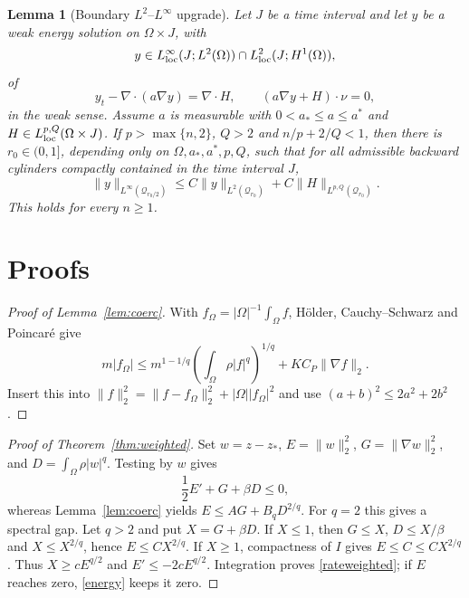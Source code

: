 \documentclass[final,5p,times,twocolumn]{elsarticle}
\newtheorem{lemma}[theorem]{Lemma}
\newcommand{\Om}{\Omega}
\newcommand{\norm}[1]{\lVert#1\rVert}
\begin{document}
\begin{lemma}[Boundary $L^2$--$L^\infty$ upgrade]\label{lem:local}
Let $J$ be a time interval and let $y$ be a weak energy solution on $\Om\times J$, with
\[
 y\in L^\infty_{\rm loc}(J;L^2(\Om))\cap L^2_{\rm loc}(J;H^1(\Om)),
\]
of
\[
 y_t-\nabla\!\cdot(a\nabla y)=\nabla\!\cdot H,
 \qquad (a\nabla y+H)\cdot\nu=0,
\]
in the weak sense. Assume $a$ is measurable with $0<a_*\le a\le a^*$ and $H\in L^{p,Q}_{\rm loc}(\Om\times J)$. If $p>\max\{n,2\}$, $Q>2$ and $n/p+2/Q<1$, then there is $r_0\in(0,1]$, depending only on $\Om,a_*,a^*,p,Q$, such that for all admissible backward cylinders compactly contained in the time interval $J$,
\begin{equation}\label{localup}
\norm y_{L^\infty(\mathcal Q_{r_0/2})}
\le C\norm y_{L^2(\mathcal Q_{r_0})}
+C\norm H_{L^{p,Q}(\mathcal Q_{r_0})}.
\end{equation}
This holds for every $n\ge1$.
\end{lemma}

\section{Proofs}
\begin{proof}[Proof of Lemma~\ref{lem:coerc}]
With $f_\Om=|\Om|^{-1}\int_\Om f$, H\"older, Cauchy--Schwarz and Poincar\'e give
\[
m|f_\Om|\le m^{1-1/q}\left(\int_\Om\rho|f|^q\right)^{1/q}+KC_P\norm{\nabla f}_2.
\]
Insert this into $\norm f_2^2=\norm{f-f_\Om}_2^2+|\Om||f_\Om|^2$ and use $(a+b)^2\le2a^2+2b^2$.
\end{proof}

\begin{proof}[Proof of Theorem~\ref{thm:weighted}]
Set $w=z-z_*$, $E=\norm w_2^2$, $G=\norm{\nabla w}_2^2$, and $D=\int_\Om\rho|w|^q$. Testing by $w$ gives
\begin{equation}\label{energy}
\frac12E'+G+\beta D\le0,
\end{equation}
whereas Lemma~\ref{lem:coerc} yields $E\le AG+B_qD^{2/q}$. For $q=2$ this gives a spectral gap. Let $q>2$ and put $X=G+\beta D$. If $X\le1$, then $G\le X$, $D\le X/\beta$ and $X\le X^{2/q}$, hence $E\le CX^{2/q}$. If $X\ge1$, compactness of $I$ gives $E\le C\le CX^{2/q}$. Thus $X\ge cE^{q/2}$ and $E'\le-2cE^{q/2}$. Integration proves \eqref{rateweighted}; if $E$ reaches zero, \eqref{energy} keeps it zero.
\end{proof}
\end{document}
